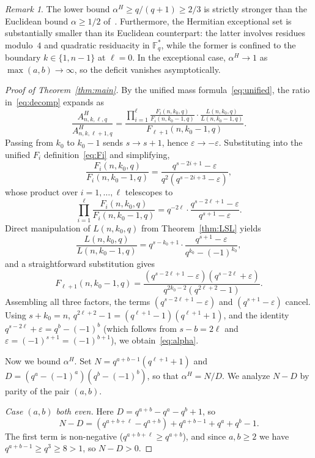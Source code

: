 \documentclass[11pt]{article}
\theoremstyle{plain}
\theoremstyle{remark}
\newtheorem{remark}[theorem]{Remark}
\newcommand{\F}{\mathbb{F}}
\begin{document}
\begin{remark}
The lower bound $\alpha^H \geq q/(q+1) \geq 2/3$ is strictly stronger
than the Euclidean bound $\alpha \geq 1/2$ of~\cite{BBOz2026}.
Furthermore, the Hermitian exceptional set is substantially smaller than its
Euclidean counterpart: the latter involves residues modulo~$4$ and quadratic
residuacity in $\F_q^*$, while the former is confined to the boundary
$k\in\{1,n-1\}$ at $\ell = 0$. In the exceptional case, $\alpha^H \to 1$
as $\max(a,b) \to \infty$, so the deficit vanishes asymptotically.
\end{remark}

\begin{proof}[Proof of Theorem~\ref{thm:main}]
By the unified mass formula~\eqref{eq:unified}, the ratio in~\eqref{eq:decomp}
expands as
\[
  \frac{A^H_{n,k,\ell,q}}{A^H_{n,k,\ell+1,q}}
  = \frac{\prod_{i=1}^{\ell}\frac{F_i(n,k_0,q)}{F_i(n,k_0-1,q)}\cdot
    \frac{L(n,k_0,q)}{L(n,k_0-1,q)}}{F_{\ell+1}(n,k_0-1,q)}.
\]
Passing from $k_0$ to $k_0-1$ sends $s\to s+1$, hence $\varepsilon\to -\varepsilon$.
Substituting into the unified $F_i$ definition~\eqref{eq:Fi} and simplifying,
\[
  \frac{F_i(n,k_0,q)}{F_i(n,k_0-1,q)} = \frac{q^{s-2i+1}-\varepsilon}{q^{2}(q^{s-2i+3}-\varepsilon)},
\]
whose product over $i = 1, \ldots, \ell$ telescopes to
\[
  \prod_{i=1}^{\ell}\frac{F_i(n,k_0,q)}{F_i(n,k_0-1,q)}
  = q^{-2\ell} \cdot \frac{q^{s-2\ell+1}-\varepsilon}{q^{s+1}-\varepsilon}.
\]
Direct manipulation of $L(n, k_0, q)$ from Theorem~\ref{thm:LSL} yields
\[
  \frac{L(n,k_0,q)}{L(n,k_0-1,q)} = q^{s-k_0+1}\cdot\frac{q^{s+1}-\varepsilon}{q^{k_0}-(-1)^{k_0}},
\]
and a straightforward substitution gives
\[
  F_{\ell+1}(n,k_0-1,q) = \frac{(q^{s-2\ell+1}-\varepsilon)(q^{s-2\ell}+\varepsilon)}{q^{2k_0-2}(q^{2\ell+2}-1)}.
\]
Assembling all three factors, the terms $(q^{s-2\ell+1}-\varepsilon)$ and
$(q^{s+1}-\varepsilon)$ cancel. Using $s+k_0 = n$,
$q^{2\ell+2}-1 = (q^{\ell+1}-1)(q^{\ell+1}+1)$, and the identity
$q^{s-2\ell}+\varepsilon = q^{b}-(-1)^{b}$
(which follows from $s-b = 2\ell$ and $\varepsilon = (-1)^{s+1} = (-1)^{b+1}$),
we obtain~\eqref{eq:alpha}.

Now we bound $\alpha^H$.
Set $N = q^{a+b-1}(q^{\ell+1}+1)$ and $D = (q^{a}-(-1)^{a})(q^{b}-(-1)^{b})$,
so that $\alpha^H = N/D$. We analyze $N - D$ by parity of the pair $(a,b)$.

\emph{Case $(a, b)$ both even.}
Here $D = q^{a+b}-q^{a}-q^{b}+1$, so
\[
  N - D = (q^{a+b+\ell}-q^{a+b}) + q^{a+b-1} + q^{a} + q^{b} - 1.
\]
The first term is non-negative ($q^{a+b+\ell} \geq q^{a+b}$), and since
$a, b \geq 2$ we have $q^{a+b-1} \geq q^3 \geq 8 > 1$, so $N - D > 0$.


\end{proof}
\end{document}
